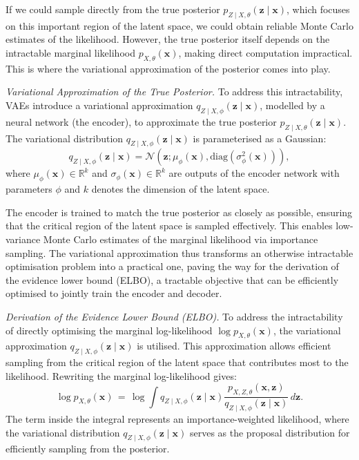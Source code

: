If we could sample directly from the true posterior \(p_{Z \mid X, \theta}(\mathbf{z} \mid \mathbf{x})\), which focuses on this important region of the latent space, we could obtain reliable Monte Carlo estimates of the likelihood. However, the true posterior itself depends on the intractable marginal likelihood \(p_{X, \theta}(\mathbf{x})\), making direct computation impractical. This is where the variational approximation of the posterior comes into play.

\textit{Variational Approximation of the True Posterior.} To address this intractability, VAEs introduce a variational approximation \(q_{Z \mid X, \phi}(\mathbf{z} \mid \mathbf{x})\), modelled by a neural network (the encoder), to approximate the true posterior \(p_{Z \mid X, \theta}(\mathbf{z} \mid \mathbf{x})\). The variational distribution \(q_{Z \mid X, \phi}(\mathbf{z} \mid \mathbf{x})\) is parameterised as a Gaussian:
\[
q_{Z \mid X, \phi}(\mathbf{z} \mid \mathbf{x}) = \mathcal{N}(\mathbf{z}; \mu_\phi(\mathbf{x}), \mathrm{diag}(\sigma_\phi^2(\mathbf{x}))),
\]
where \(\mu_\phi(\mathbf{x}) \in \mathbb{R}^k\) and \(\sigma_\phi(\mathbf{x}) \in \mathbb{R}^k\) are outputs of the encoder network with parameters \(\phi\) and $k$ denotes the dimension of the latent space.

The encoder is trained to match the true posterior as closely as possible, ensuring that the critical region of the latent space is sampled effectively. This enables low-variance Monte Carlo estimates of the marginal likelihood via importance sampling. The variational approximation thus transforms an otherwise intractable optimisation problem into a practical one, paving the way for the derivation of the evidence lower bound (ELBO), a tractable objective that can be efficiently optimised to jointly train the encoder and decoder.

\textit{Derivation of the Evidence Lower Bound (ELBO).} To address the intractability of directly optimising the marginal log-likelihood \(\log p_{X,\theta}(\mathbf{x})\), the variational approximation \(q_{Z\mid X,\phi}(\mathbf{z} \mid \mathbf{x})\) is utilised. This approximation allows efficient sampling from the critical region of the latent space that contributes most to the likelihood. Rewriting the marginal log-likelihood gives:
\[
\log p_{X,\theta}(\mathbf{x}) 
\,=\,
\log 
\int 
q_{Z \mid X,\phi}(\mathbf{z} \mid \mathbf{x}) 
\frac{p_{X,Z,\theta}(\mathbf{x}, \mathbf{z})}{q_{Z \mid X,\phi}(\mathbf{z} \mid \mathbf{x})}
\, d\mathbf{z}.
\]
The term inside the integral represents an importance-weighted likelihood, where the variational distribution \(q_{Z \mid X,\phi}(\mathbf{z} \mid \mathbf{x})\) serves as the proposal distribution for efficiently sampling from the posterior. 

